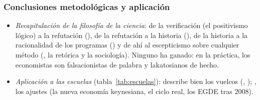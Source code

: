 \documentclass[11pt]{article}
\begin{document}
\subsubsection{Conclusiones metodológicas y aplicación}\label{sec:conclusiones-metodologicas}

\begin{itemize}
\item \emph{Recapitulación de la filosofía de la ciencia}: de la verificación (el positivismo lógico) a la refutación (), de la refutación a la historia (), de la historia a la racionalidad de los programas () y de ahí al escepticismo sobre cualquier método (, la retórica y la sociología). Ninguno ha ganado: en la práctica, los economistas son falsacionistas de palabra y lakatosianos de hecho.
\item \emph{Aplicación a las escuelas} (tabla~\ref{tab:escuelas}):  describe bien los vuelcos (, ); , los ajustes (la nueva economía keynesiana, el ciclo real, los EGDE tras 2008).
\end{itemize}
\end{document}
